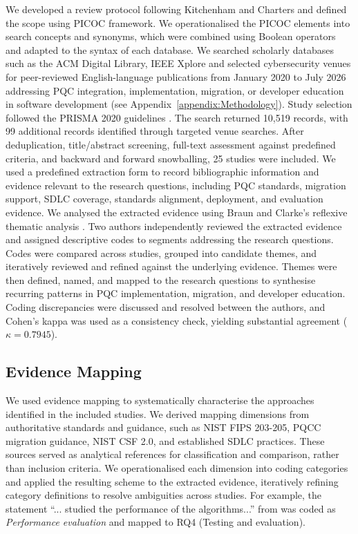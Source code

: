 \documentclass[letterpaper,twocolumn,10pt]{article}
\begin{document}
We developed a review protocol following Kitchenham and Charters \cite{kitchenham_procedures_2004} and defined the scope using PICOC framework. We operationalised the PICOC elements into search concepts and synonyms, which were combined using Boolean operators and adapted to the syntax of each database. We searched scholarly databases such as the ACM Digital Library, IEEE Xplore and selected cybersecurity venues for peer-reviewed English-language publications from January 2020 to July 2026 addressing PQC integration, implementation, migration, or developer education in software development (see Appendix~\ref{appendix:Methodology}). Study selection followed the PRISMA 2020 guidelines \cite{page_prisma_2021}. The search returned 10,519 records, with 99 additional records identified through targeted venue searches. After deduplication, title/abstract screening, full-text assessment against predefined criteria, and backward and forward snowballing, 25 studies were included. We used a predefined extraction form to record bibliographic information and evidence relevant to the research questions, including PQC standards, migration support, SDLC coverage, standards alignment, deployment, and evaluation evidence. We analysed the extracted evidence using Braun and Clarke's reflexive thematic analysis \cite{braun_using_2006}. Two authors independently reviewed the extracted evidence and assigned descriptive codes to segments addressing the research questions. Codes were compared across studies, grouped into candidate themes, and iteratively reviewed and refined against the underlying evidence. Themes were then defined, named, and mapped to the research questions to synthesise recurring patterns in PQC implementation, migration, and developer education. Coding discrepancies were discussed and resolved between the authors, and Cohen's kappa was used as a consistency check, yielding substantial agreement ($\kappa = 0.7945$).

\subsection{Evidence Mapping}
\label{StudyMapping}

We used evidence mapping to systematically characterise the approaches identified in the included studies. We derived mapping dimensions from authoritative standards and guidance, such as NIST FIPS 203-205, PQCC migration guidance, NIST CSF 2.0, and established SDLC practices. These sources served as analytical references for classification and comparison, rather than inclusion criteria. We operationalised each dimension into coding categories and applied the resulting scheme to the extracted evidence, iteratively refining category definitions to resolve ambiguities across studies. For example, the statement “... studied the performance of the algorithms...” from \cite{Ana_hekkala_implementing_2023} was coded as \textit{Performance evaluation} and mapped to RQ4 (Testing and evaluation).
\end{document}

